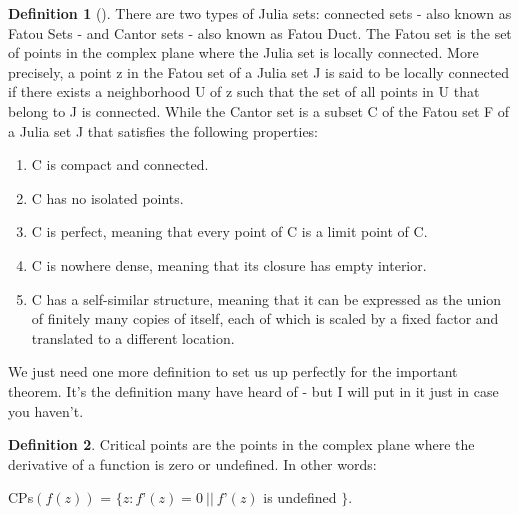 \documentclass[a4paper,11pt]{article}
\theoremstyle{definition}
\newtheorem{defn}{Definition}[section] %
\numberwithin{equation}{section} %
\begin{document}
\begin{defn}[\cite{defn-of-fatou-sets-dust}]
    There are two types of Julia sets: connected sets - also known as Fatou Sets - and Cantor sets - also known as Fatou Duct.
    The Fatou set is the set of points in the complex plane where the Julia set is locally connected. More precisely, a point z in the Fatou set of a Julia set J is said to be locally connected if there exists a neighborhood U of z such that the set of all points in U that belong to J is connected.
    While the Cantor set is a subset C of the Fatou set F of a Julia set J that satisfies the following properties:
    \begin{enumerate}
        \item C is compact and connected.
        \item C has no isolated points.
        \item C is perfect, meaning that every point of C is a limit point of C.
        \item C is nowhere dense, meaning that its closure has empty interior.
        \item C has a self-similar structure, meaning that it can be expressed as the union of finitely many copies of itself, each of which is scaled by a fixed factor and translated to a different location.
    \end{enumerate}

\end{defn}

We just need one more definition to set us up perfectly for the important theorem. It's the definition many have heard of - but I will put in it just in case you haven't.

\begin{defn}
    Critical points are the points in the complex plane where the derivative of a function is zero or undefined. In other words:
    \begin{center}
        CPs$( f(z) )$ = $\{ z : f’(z) = 0~||~f’(z) $ is undefined $ \}$.
    \end{center}
    
\end{defn}
\end{document}
